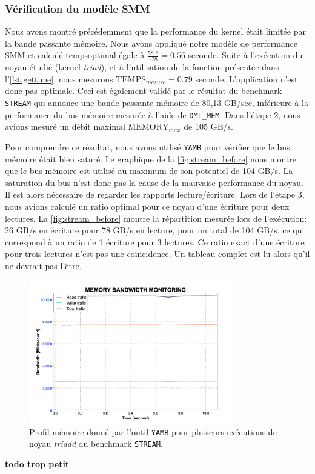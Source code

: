         
    \subsubsection{Vérification du modèle SMM}
    
        Nous avons montré précédemment que la performance du kernel était limitée par la bande passante mémoire. Nous avons appliqué notre modèle de performance SMM et calculé \gls{tempsoptimal} égale à $\frac{58.8}{128} = 0.56$ seconde. Suite à l'exécution du noyau étudié (kernel \textit{triad}), et à l'utilisation de la fonction présentée dans l'\autoref{lst:gettime}, nous mesurons $\text{TEMPS}_{mesure} = 0.79$ seconde.
        L'application n'est donc pas optimale. Ceci est également validé par le résultat du benchmark \verb|STREAM| qui annonce une bande passante mémoire de 80,13 GB/sec, inférieure à la performance du bus mémoire mesurée à l'aide de \verb=DML_MEM=. Dans l'étape 2, nous avions mesuré un débit maximal $\text{MEMORY}_{max}$ de 105 GB/s.
        
        Pour comprendre ce résultat, nous avons utilisé \verb|YAMB| pour vérifier que le bus mémoire était bien saturé. Le graphique de la \autoref{fig:stream_before} nous montre que le bus mémoire est utilisé au maximum de son potentiel de 104 GB/s. La saturation du bus n'est donc pas la cause de la mauvaise performance du noyau. Il est alors nécessaire de regarder les rapports lecture/écriture. Lors de l'étape 3, nous avions calculé un ratio optimal pour ce noyau  d'une écriture pour deux lectures. La \autoref{fig:stream_before} montre la répartition mesurée lors de l'exécution: 26 GB/s en écriture pour 78 GB/s en lecture, pour un total de 104 GB/s, ce qui correspond à un ratio de 1 écriture pour 3 lectures. Ce ratio exact d'une écriture pour trois lectures n'est pas une coïncidence. Un tableau complet est lu alors qu'il ne devrait pas l'être.
        
        \begin{figure}[htb]
        {
        \centering
        \includegraphics[width=0.80\textwidth]{images/stream_before.png}
        \caption{Profil mémoire donné par l'outil \texttt{YAMB} pour plusieurs exécutions de noyau \textit{triadd} du benchmark \texttt{STREAM}. }\label{fig:stream_before}
        }
        \end{figure}
        \textbf{todo trop petit}


